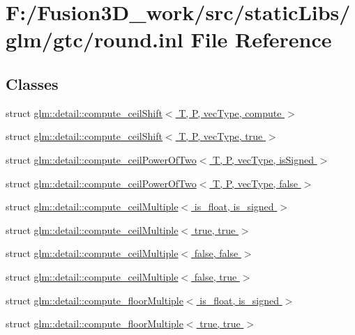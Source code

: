 \hypertarget{round_8inl}{}\section{F\+:/\+Fusion3\+D\+\_\+work/src/static\+Libs/glm/gtc/round.inl File Reference}
\label{round_8inl}
\subsection*{Classes}
\begin{DoxyCompactItemize}
\item 
struct \hyperlink{structglm_1_1detail_1_1compute__ceil_shift}{glm\+::detail\+::compute\+\_\+ceil\+Shift$<$ T, P, vec\+Type, compute $>$}
\item 
struct \hyperlink{structglm_1_1detail_1_1compute__ceil_shift_3_01_t_00_01_p_00_01vec_type_00_01true_01_4}{glm\+::detail\+::compute\+\_\+ceil\+Shift$<$ T, P, vec\+Type, true $>$}
\item 
struct \hyperlink{structglm_1_1detail_1_1compute__ceil_power_of_two}{glm\+::detail\+::compute\+\_\+ceil\+Power\+Of\+Two$<$ T, P, vec\+Type, is\+Signed $>$}
\item 
struct \hyperlink{structglm_1_1detail_1_1compute__ceil_power_of_two_3_01_t_00_01_p_00_01vec_type_00_01false_01_4}{glm\+::detail\+::compute\+\_\+ceil\+Power\+Of\+Two$<$ T, P, vec\+Type, false $>$}
\item 
struct \hyperlink{structglm_1_1detail_1_1compute__ceil_multiple}{glm\+::detail\+::compute\+\_\+ceil\+Multiple$<$ is\+\_\+float, is\+\_\+signed $>$}
\item 
struct \hyperlink{structglm_1_1detail_1_1compute__ceil_multiple_3_01true_00_01true_01_4}{glm\+::detail\+::compute\+\_\+ceil\+Multiple$<$ true, true $>$}
\item 
struct \hyperlink{structglm_1_1detail_1_1compute__ceil_multiple_3_01false_00_01false_01_4}{glm\+::detail\+::compute\+\_\+ceil\+Multiple$<$ false, false $>$}
\item 
struct \hyperlink{structglm_1_1detail_1_1compute__ceil_multiple_3_01false_00_01true_01_4}{glm\+::detail\+::compute\+\_\+ceil\+Multiple$<$ false, true $>$}
\item 
struct \hyperlink{structglm_1_1detail_1_1compute__floor_multiple}{glm\+::detail\+::compute\+\_\+floor\+Multiple$<$ is\+\_\+float, is\+\_\+signed $>$}
\item 
struct \hyperlink{structglm_1_1detail_1_1compute__floor_multiple_3_01true_00_01true_01_4}{glm\+::detail\+::compute\+\_\+floor\+Multiple$<$ true, true $>$}

\end{DoxyCompactItemize}

